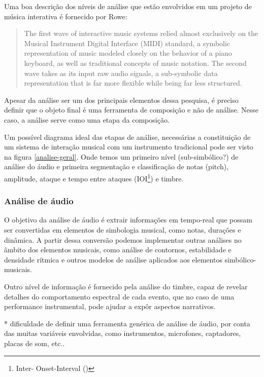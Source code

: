 \documentclass{ppgmus}
\begin{document}
Uma boa descrição dos níveis de análise que estão envolvidos em um projeto
de música interativa é fornecido por Rowe:

\begin{quotation}
 The first wave of interactive music systems relied almost exclusively on the Musical 
Instrument Digital Interface (MIDI) standard, a symbolic representation of music modeled 
closely on the behavior of a piano keyboard, as well as traditional concepts of music notation. 
The second wave takes as its input raw audio signals, a sub-symbolic data representation that is far 
more flexible while being far less structured. 
\end{quotation}




Apesar da análise ser um dos principais elementos dessa pesquisa, é preciso
definir que o objeto final é uma ferramenta de composição e não de análise.
Nesse caso, a análise serve como uma etapa da composição. 

Um possível diagrama ideal das etapas de análise, necessárias a
constituição de um sistema de interação musical com um instrumento
tradicional pode ser visto na figura \ref{analise-geral}. Onde temos um
primeiro nível (sub-simbólico?) de análise do áudio e primeira segmentação
e classificação de notas (pitch), amplitude, ataque e tempo entre ataques (IOI\footnote{Inter-
Onset-Interval (\cite{rowe01})}) e timbre.




\subsubsection{Análise de áudio}


O objetivo da análise de áudio é extrair informações em tempo-real
que possam ser convertidas em elementos de simbologia musical, como notas, durações e dinâmica.
A partir dessa conversão podemos implementar outras análises no 
âmbito dos elementos musicais, como análise de contornos, estabilidade e 
densidade rítmica e outros modelos de análise aplicados aos elementos
simbólico-musicais. 

Outro nível de informação é fornecido pela análise do timbre, capaz
de revelar detalhes do comportamento espectral de cada evento, que no caso de uma 
performance instrumental, pode ajudar a expôr aspectos narrativos.

* dificuldade de definir uma ferramenta genérica de análise de áudio,
por conta das muitas variáveis envolvidas, como instrumentos, microfones, captadores,
placas de som, etc..
\end{document}
